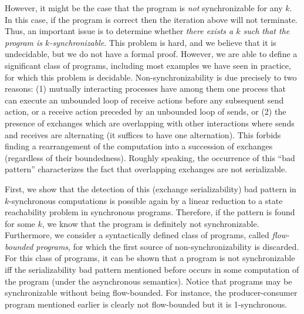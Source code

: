 However, it might be the case that the program is {\em not} synchronizable for any $k$. In this case, if the program is correct then the iteration above will not terminate. Thus, an important issue is to determine whether {\em there exists a $k$ such that the program is $k$-synchronizable}. This problem is hard, and we believe that it is undecidable, but we do not have a formal proof. However, we are able to define a significant class of programs, including most examples we have seen in practice, for which this problem is decidable.  Non-synchronizability is due precisely to two reasons: (1) mutually interacting processes have among them one process that can execute an unbounded loop of receive actions before any subsequent send action, or a receive action preceded by an unbounded loop of sends, or (2)
the presence of exchanges which are overlapping with other interactions where sends and receives are alternating (it suffices to have one alternation). This forbids finding a rearrangement of the computation into a succession of exchanges (regardless of their boundedness). Roughly speaking, the occurrence of this “bad pattern” characterizes the fact that overlapping exchanges are not serializable. 

First, we show that the detection of this (exchange serializability) bad pattern in $k$-synchronous computations is possible again by a linear reduction to a state reachability problem in synchronous programs. Therefore, if the pattern is found for some $k$, we know that the program is definitely not synchronizable. 
Furthermore, we consider a syntactically defined class of programs, called {\em flow-bounded programs}, for which the first source of non-synchronizability is  discarded. 
For this class of programs, it can be shown that a program is not synchronizable iff the serializability bad pattern mentioned before occurs in some computation of the program (under the asynchronous semantics). %
Notice that programs may be synchronizable without being flow-bounded. For instance, the producer-consumer program mentioned earlier is clearly not flow-bounded but it is 1-synchronous. 

